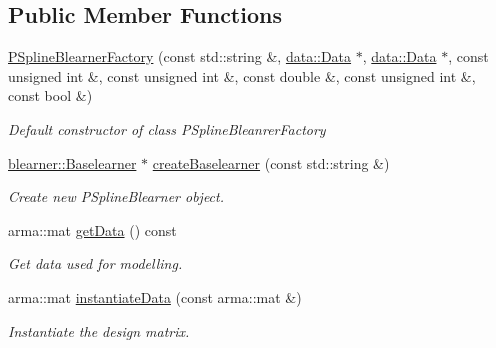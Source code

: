 \subsection*{Public Member Functions}
\begin{DoxyCompactItemize}
\item 
\hyperlink{classblearnerfactory_1_1_p_spline_blearner_factory_af0b1b2a0c594d4adfd038a467a32649d}{P\+Spline\+Blearner\+Factory} (const std\+::string \&, \hyperlink{classdata_1_1_data}{data\+::\+Data} $\ast$, \hyperlink{classdata_1_1_data}{data\+::\+Data} $\ast$, const unsigned int \&, const unsigned int \&, const double \&, const unsigned int \&, const bool \&)
\begin{DoxyCompactList}\small\item\em Default constructor of class {\ttfamily P\+Spline\+Bleanrer\+Factory} \end{DoxyCompactList}\item 
\hyperlink{classblearner_1_1_baselearner}{blearner\+::\+Baselearner} $\ast$ \hyperlink{classblearnerfactory_1_1_p_spline_blearner_factory_a877072332da418456dcbcb27c572c1e7}{create\+Baselearner} (const std\+::string \&)
\begin{DoxyCompactList}\small\item\em Create new {\ttfamily P\+Spline\+Blearner} object. \end{DoxyCompactList}\item 
arma\+::mat \hyperlink{classblearnerfactory_1_1_p_spline_blearner_factory_a9363131f08b3b3c1c482786347d13f7c}{get\+Data} () const
\begin{DoxyCompactList}\small\item\em Get data used for modelling. \end{DoxyCompactList}\item 
arma\+::mat \hyperlink{classblearnerfactory_1_1_p_spline_blearner_factory_a290a1c60224d027059939a895b474aa1}{instantiate\+Data} (const arma\+::mat \&)
\begin{DoxyCompactList}\small\item\em Instantiate the design matrix. \end{DoxyCompactList}\end{DoxyCompactItemize}
